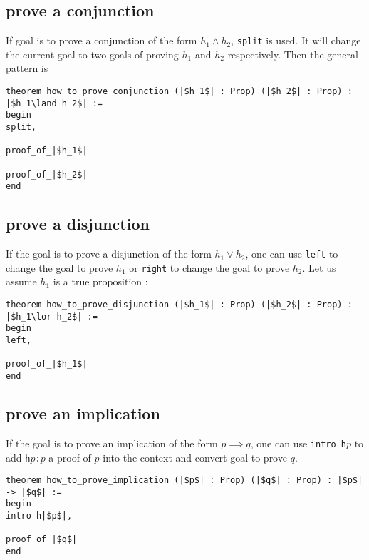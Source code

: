 \documentclass{report}
\theoremstyle{definition}
\theoremstyle{plain}
\begin{document}
\subsection*{prove a conjunction}\label{lean:conj}
If goal is to prove a conjunction of the form $h_1 \land h_2$, {\tt \small split} is used. It will change the current goal to two goals of proving $h_1$ and $h_2$ respectively. Then the general pattern is

\begin{verbatim}
theorem how_to_prove_conjunction (|$h_1$| : Prop) (|$h_2$| : Prop) : |$h_1\land h_2$| :=
begin
split,

proof_of_|$h_1$|

proof_of_|$h_2$|
end
\end{verbatim}


\subsection{prove a disjunction}\label{lean:disjun}
If the goal is to prove a disjunction of the form $h_1 \lor h_2$, one can use {\tt \small left} to change the goal to prove $h_1$ or {\tt \small right} to change the goal to prove $h_2$. Let us assume $h_1$ is a true proposition :

\begin{verbatim}
theorem how_to_prove_disjunction (|$h_1$| : Prop) (|$h_2$| : Prop) : |$h_1\lor h_2$| :=
begin
left,
  
proof_of_|$h_1$|
end
\end{verbatim}


\subsection{prove an implication}\label{lean:imp}
If the goal is to prove an implication of the form $p \implies q$, one can use {\tt \small intro h$p$} to add {\tt \small h$p$:$p$} a proof of $p$ into the context and convert goal to prove $q$.

\begin{verbatim}
theorem how_to_prove_implication (|$p$| : Prop) (|$q$| : Prop) : |$p$| -> |$q$| :=
begin
intro h|$p$|,
  
proof_of_|$q$|
end
\end{verbatim}
\end{document}

